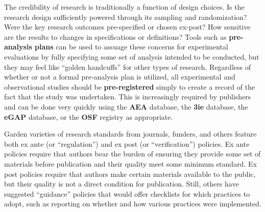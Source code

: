The credibility of research is traditionally a function of design choices.\cite{angrist2010credibility,ioannidis2005most}
Is the research design sufficiently powered through its sampling and randomization?
Were the key research outcomes pre-specified or chosen ex-post?
How sensitive are the results to changes in specifications or definitions?
Tools such as \textbf{pre-analysis plans}
can be used to assuage these concerns for experimental evaluations
by fully specifying some set of analysis intended to be conducted,
but they may feel like ``golden handcuffs'' for other types of research.\cite{olken2015promises}
Regardless of whether or not a formal pre-analysis plan is utilized,
all experimental and observational studies should be \textbf{pre-registered}
simply to create a record of the fact that the study was undertaken.
This is increasingly required by publishers and can be done very quickly
using the \textbf{AEA} database,
the \textbf{3ie} database,
the \textbf{eGAP} database,
or the \textbf{OSF} registry as appropriate.

Garden varieties of research standards from journals, funders, and others feature both ex ante
(or ``regulation'') and ex post (or ``verification'') policies.
Ex ante policies require that authors bear the burden
of ensuring they provide some set of materials before publication
and their quality meet some minimum standard.
Ex post policies require that authors make certain materials available to the public,
but their quality is not a direct condition for publication.
Still, others have suggested ``guidance'' policies that would offer checklists
for which practices to adopt, such as reporting on whether and how
various practices were implemented.

